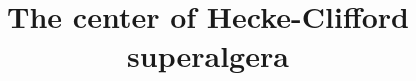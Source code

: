 \documentclass[a4paper]{amsart}
\title{The center of Hecke-Clifford superalgera }
\begin{document}
\maketitle

\ifcheck
\tableofcontents
\fi

%
%





%
\end{document}
